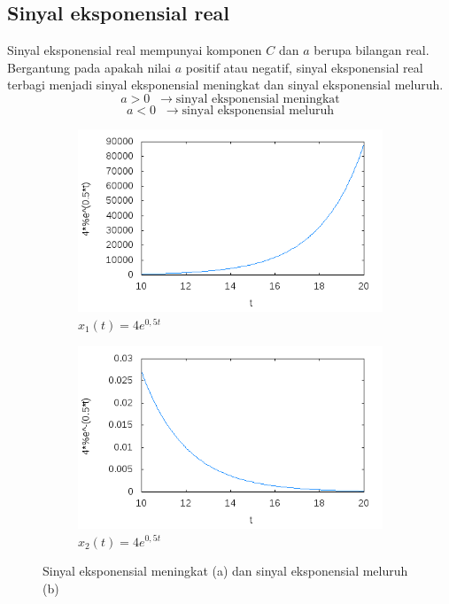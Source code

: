 \subsection{Sinyal eksponensial real}
Sinyal eksponensial real mempunyai komponen $C$ dan $a$ berupa bilangan real. Bergantung pada apakah nilai $a$ positif atau negatif, sinyal eksponensial real terbagi menjadi sinyal eksponensial meningkat dan sinyal eksponensial meluruh.
\[
a>0\;\;\rightarrow \text{sinyal eksponensial meningkat}
\]
\[
a<0\;\;\rightarrow \text{sinyal eksponensial meluruh}
\]
\begin{figure}[!h]
\centering
\begin{subfigure}[b]{0.4\textwidth}
\includegraphics[width=\textwidth]{pict/exponensial1}
\caption{$x_1(t)=4e^{0,5t}$}
\end{subfigure}%
\begin{subfigure}[b]{0.4\textwidth}
\includegraphics[width=\textwidth]{pict/exponensial2}
\caption{$x_2(t)=4e^{0,5t}$}
\end{subfigure}
\caption{Sinyal eksponensial meningkat (a) dan sinyal eksponensial meluruh (b)}
\end{figure}

